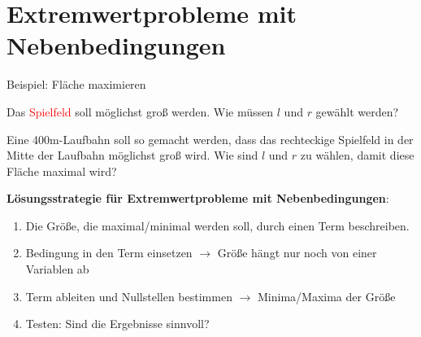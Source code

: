 \section{Extremwertprobleme mit Nebenbedingungen}

\begin{bla}{Beispiel: Fläche maximieren}
  \begin{marginfigure}[5em]
    \caption{Das \textcolor{red}{Spielfeld} soll möglichst groß werden. Wie müssen $l$ und $r$ gewählt werden?}
  \end{marginfigure}
  Eine 400m-Laufbahn soll so gemacht werden, dass das rechteckige Spielfeld in der Mitte der Laufbahn möglichst groß wird. Wie sind $l$ und $r$ zu wählen, damit diese Fläche maximal wird?
\end{bla}

\begin{koch}
  \textbf{Lösungsstrategie für Extremwertprobleme mit Nebenbedingungen}:
  \begin{enumerate}
    \item Die Größe, die maximal/minimal werden soll, durch einen Term beschreiben.
    \item Bedingung in den Term einsetzen $\rightarrow$ Größe hängt nur noch von einer Variablen ab
    \item Term ableiten und Nullstellen bestimmen $\rightarrow$ Minima/Maxima der Größe
    \item Testen: Sind die Ergebnisse sinnvoll?
  \end{enumerate}
\end{koch}



